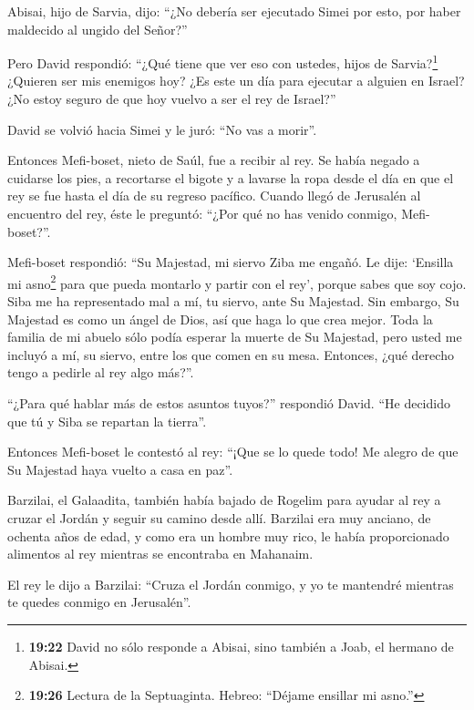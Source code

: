  Abisai, hijo de Sarvia, dijo: ``¿No debería ser ejecutado
Simei por esto, por haber maldecido al ungido del Señor?''

 Pero David respondió: ``¿Qué tiene que ver eso con
ustedes, hijos de Sarvia?\footnote{\textbf{19:22} David no sólo responde
  a Abisai, sino también a Joab, el hermano de Abisai.} ¿Quieren ser mis
enemigos hoy? ¿Es este un día para ejecutar a alguien en Israel? ¿No
estoy seguro de que hoy vuelvo a ser el rey de Israel?''

 David se volvió hacia Simei y le juró: ``No vas a morir''.

 Entonces Mefi-boset, nieto de Saúl, fue a recibir al rey.
Se había negado a cuidarse los pies, a recortarse el bigote y a lavarse
la ropa desde el día en que el rey se fue hasta el día de su regreso
pacífico.  Cuando llegó de Jerusalén al encuentro del rey,
éste le preguntó: ``¿Por qué no has venido conmigo, Mefi-boset?''.

 Mefi-boset respondió: ``Su Majestad, mi siervo Ziba me
engañó. Le dije: `Ensilla mi asno\footnote{\textbf{19:26} Lectura de la
  Septuaginta. Hebreo: ``Déjame ensillar mi asno.''} para que pueda
montarlo y partir con el rey', porque sabes que soy cojo. 
Siba me ha representado mal a mí, tu siervo, ante Su Majestad. Sin
embargo, Su Majestad es como un ángel de Dios, así que haga lo que crea
mejor.  Toda la familia de mi abuelo sólo podía esperar la
muerte de Su Majestad, pero usted me incluyó a mí, su siervo, entre los
que comen en su mesa. Entonces, ¿qué derecho tengo a pedirle al rey algo
más?''.

 ``¿Para qué hablar más de estos asuntos tuyos?'' respondió
David. ``He decidido que tú y Siba se repartan la tierra''.

 Entonces Mefi-boset le contestó al rey: ``¡Que se lo quede
todo! Me alegro de que Su Majestad haya vuelto a casa en paz''.

 Barzilai, el Galaadita, también había bajado de Rogelim
para ayudar al rey a cruzar el Jordán y seguir su camino desde allí.
 Barzilai era muy anciano, de ochenta años de edad, y como
era un hombre muy rico, le había proporcionado alimentos al rey mientras
se encontraba en Mahanaim.

 El rey le dijo a Barzilai: ``Cruza el Jordán conmigo, y yo
te mantendré mientras te quedes conmigo en Jerusalén''.


